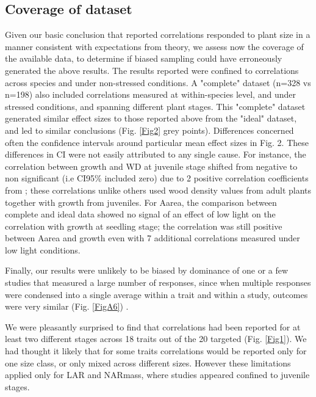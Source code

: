 \documentclass[a4paper]{article}\usepackage[]{graphicx}\usepackage[]{color}
\begin{document}
\subsection*{Coverage of dataset}

Given our basic conclusion that reported correlations responded to plant size in a manner consistent with expectations from theory, we assess now the coverage of the available data, to determine if biased sampling could have erroneously generated the above results. The results reported were confined to correlations across species and under non-stressed conditions. A "complete" dataset (n=328 vs n=198) also included correlations measured at within-species level, and under stressed conditions, and spanning different plant stages. This "complete" dataset generated similar effect sizes to those reported above from the "ideal" dataset, and led to similar conclusions (Fig. \ref{Fig2} grey points). Differences concerned often the confidence intervals around particular mean effect sizes in Fig. 2. These differences in CI were not easily attributed to any single cause. For instance, the correlation between growth and WD at juvenile stage shifted from negative to non significant (i.e CI95\% included zero) due to 2 positive correlation coefficients from \citet{Augspurger:1984ct};  these correlations unlike others used wood density values from adult plants together with growth from juveniles. For Aarea, the comparison between complete and ideal data showed no signal of an effect of low light on the correlation with growth at seedling stage; the correlation was still positive between Aarea and growth even with 7 additional correlations measured under low light conditions.

Finally, our results were unlikely to be biased by dominance of one or a few studies that measured a large number of responses, since when multiple responses were condensed into a single average within a trait and within a study, outcomes were very similar (Fig. \ref{FigA6}) . 


We were pleasantly surprised to find that correlations had been reported for at least two different stages across 18 traits out of the 20 targeted (Fig. \ref{Fig1}). We had thought it likely that for some traits correlations would be reported only for one size class, or only mixed across different sizes. However these limitations applied only for LAR and NARmass, where studies appeared confined to juvenile stages.  
\end{document}
